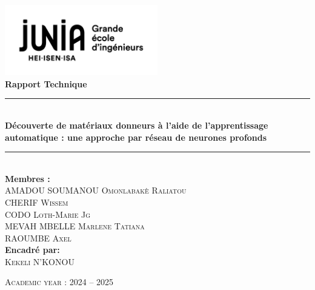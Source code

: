 


\begin{center}

    \includegraphics[width=0.5\textwidth]{PageGarde/junia.png}\\[1cm]

    {\Large \textbf{Rapport Technique}}\\[1cm]


    \rule{\textwidth}{0.5pt}\\[0.8cm]
    {\Huge \textbf{Découverte de matériaux donneurs à l’aide de l’apprentissage automatique : une approche par réseau de neurones profonds}}\\[0.8cm]
    \rule{\textwidth}{0.5pt}\\[2cm]

    \textbf{Membres :}\\
    \textsc{AMADOU SOUMANOU Omonlabakè Raliatou}\\
    \textsc{CHERIF Wissem}\\
    \textsc{CODO Loth-Marie Jg}\\
    \textsc{MEVAH MBELLE Marlene Tatiana}\\
    \textsc{RAOUMBE Axel}\\[3cm]

    \textbf{Encadré par:}\\
    \textsc{Kekeli N'KONOU}\\[1cm] %

    \vfill

    


    {\large \textsc{Academic year : 2024 – 2025}}
    
\end{center}

